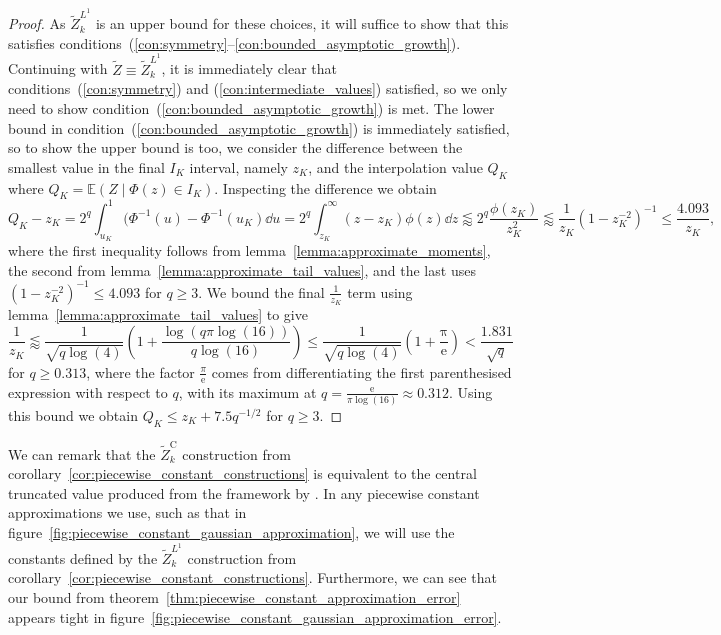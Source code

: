 \documentclass[manuscript,review]{acmart}
\begin{document}
\begin{proof}
As $ \tilde{Z}_k^{L^1} $ is an upper bound for these choices, it will suffice to show that this satisfies conditions~(\ref{con:symmetry}--\ref{con:bounded_asymptotic_growth}).  Continuing with $ \tilde{Z} \equiv  \tilde{Z}_k^{L^1}$, it is immediately clear that conditions~(\ref{con:symmetry}) and (\ref{con:intermediate_values}) satisfied, so we only need to show condition~(\ref{con:bounded_asymptotic_growth}) is met. The lower bound in condition~(\ref{con:bounded_asymptotic_growth}) is immediately satisfied, so to show the upper bound is too, we consider the difference between the smallest value in the final $ I_K $ interval, namely $ z_K $, and the interpolation value $ Q_K $ where $ Q_K = \mathbb{E}(Z \mid \Phi(z) \in I_K) $. Inspecting the difference we obtain
\begin{equation*}
Q_K - z_K = 2^q \int_{u_K}^{1} (\Phi^{-1}(u) - \Phi^{-1}(u_K) \dd{u} = 2^q \int_{z_K}^{\infty} (z - z_K) \phi(z) \dd{z} \lessapprox  2^q \dfrac{\phi(z_K)}{z_K^2} \lessapprox \dfrac{1}{z_K} (1 - z_K^{-2})^{-1} \leq \dfrac{4.093}{z_K},
\end{equation*}
where the first inequality follows from lemma~\ref{lemma:approximate_moments}, the second from lemma~\ref{lemma:approximate_tail_values}, and the last uses $ (1 - z_K^{-2})^{-1} \leq 4.093 $ for $ q \geq 3 $. We bound the final $ \tfrac{1}{z_K} $ term using lemma~\ref{lemma:approximate_tail_values} to give
\begin{equation*}
\dfrac{1}{z_K} \lessapprox \frac{1}{\sqrt{q\log(4)}} \left(1 + \frac{\log(q\pi\log(16))}{q\log(16)}\right) \leq  \frac{1}{\sqrt{q\log(4)}}\left(1 +  \frac{\mathrm{\pi}}{\mathrm{e}}\right) <  \frac{1.831}{\sqrt{q}}
\end{equation*}
for $ q \geq 0.313 $, where the factor $ \tfrac{\pi}{\mathrm{e}} $ comes from differentiating the first parenthesised expression with respect to $ q $, with its maximum at $ q = \tfrac{\mathrm{e}}{\pi\log(16)} \approx 0.312 $. Using this bound we obtain $ Q_K \leq z_K + 7.5 q^{-1/2} $ for $ q \geq 3 $. \qedhere
\end{proof}

We can remark that the $ \tilde{Z}_k^\mathrm{C} $ construction from corollary~\ref{cor:piecewise_constant_constructions} is equivalent to the central truncated value produced from the framework by \citet[(4)]{giles2019random_quadrature}. In any piecewise constant approximations we use, such as that in figure~\ref{fig:piecewise_constant_gaussian_approximation}, we will use the constants defined by  the $ \tilde{Z}_k^{L^1} $ construction from corollary~\ref{cor:piecewise_constant_constructions}. Furthermore, we can see that our bound from theorem~\ref{thm:piecewise_constant_approximation_error} appears tight in figure~\ref{fig:piecewise_constant_gaussian_approximation_error}.
\end{document}
